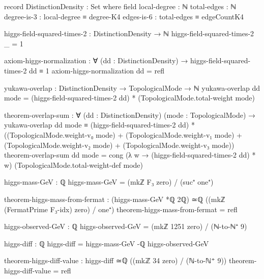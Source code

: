 \documentclass[11pt,a4paper]{book}
\begin{document}
\begin{code}
record DistinctionDensity : Set where
  field
    local-degree : ℕ
    total-edges : ℕ
    degree-is-3 : local-degree ≡ degree-K4
    edges-is-6 : total-edges ≡ edgeCountK4

higgs-field-squared-times-2 : DistinctionDensity → ℕ
higgs-field-squared-times-2 _ = 1

axiom-higgs-normalization :
  ∀ (dd : DistinctionDensity) →
  higgs-field-squared-times-2 dd ≡ 1
axiom-higgs-normalization dd = refl

yukawa-overlap : DistinctionDensity → TopologicalMode → ℕ
yukawa-overlap dd mode = 
  (higgs-field-squared-times-2 dd) * (TopologicalMode.total-weight mode)

theorem-overlap-sum :
  ∀ (dd : DistinctionDensity) (mode : TopologicalMode) →
  yukawa-overlap dd mode ≡
    (higgs-field-squared-times-2 dd) *
    ((TopologicalMode.weight-v₀ mode) +
     (TopologicalMode.weight-v₁ mode) +
     (TopologicalMode.weight-v₂ mode) +
     (TopologicalMode.weight-v₃ mode))
theorem-overlap-sum dd mode = 
  cong (λ w → (higgs-field-squared-times-2 dd) * w) (TopologicalMode.total-weight-def mode)

\end{code}

\begin{code}
higgs-mass-GeV : ℚ
higgs-mass-GeV = (mkℤ F₃ zero) / (suc⁺ one⁺)

theorem-higgs-mass-from-fermat : (higgs-mass-GeV *ℚ 2ℚ) ≃ℚ ((mkℤ (FermatPrime F₃-idx) zero) / one⁺)
theorem-higgs-mass-from-fermat = refl

higgs-observed-GeV : ℚ
higgs-observed-GeV = (mkℤ 1251 zero) / (ℕ-to-ℕ⁺ 9)

higgs-diff : ℚ
higgs-diff = higgs-mass-GeV -ℚ higgs-observed-GeV

theorem-higgs-diff-value : higgs-diff ≃ℚ ((mkℤ 34 zero) / (ℕ-to-ℕ⁺ 9))
theorem-higgs-diff-value = refl
\end{code}
\end{document}

